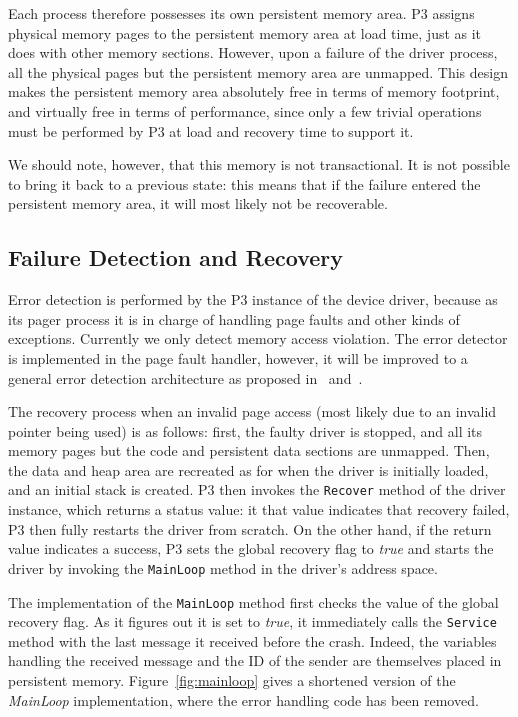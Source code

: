\documentclass{acm_proc_article-sp}
\begin{document}
Each process therefore possesses its own persistent memory area. P3 assigns physical memory pages to the persistent memory area at load time, just as it does with other memory sections. However, upon a failure of the driver process, all the physical pages but the persistent memory area are unmapped. This design makes the persistent memory area absolutely free in terms of memory footprint, and virtually free in terms of performance, since only a few trivial operations must be performed by P3 at load and recovery time to support it.

We should note, however, that this memory is not transactional. It is not possible to bring it back to a previous state: this means that if the failure entered the persistent memory area, it will most likely not be recoverable.

\subsection{Failure Detection and Recovery}
Error detection is performed by the P3 instance of the device driver, because as its pager process it is in charge of handling page faults and other kinds of exceptions. Currently we only detect memory access violation.  The error detector is implemented in the page fault handler, however, it will be improved to a general error detection architecture as proposed in~\cite{Qin2007} and~\cite{Wang2006}.

The recovery process when an invalid page access (most likely due to an invalid pointer being used) is as follows: first, the faulty driver is stopped, and all its memory pages but the code and persistent data sections are unmapped. Then, the data and heap area are recreated as for when the driver is initially loaded, and an initial stack is created. P3 then invokes the \texttt{Recover} method of the driver instance, which returns a status value: it that value indicates that recovery failed, P3 then fully restarts the driver from scratch. On the other hand, if the return value indicates a success, P3 sets the global recovery flag to \emph{true} and starts the driver by invoking the \texttt{MainLoop} method in the driver's address space.

The implementation of the \texttt{MainLoop} method first checks the value of the global recovery flag. As it figures out it is set to \emph{true}, it immediately calls the \texttt{Service} method with the last message it received before the crash. Indeed, the variables handling the received message and the ID of the sender are themselves placed in persistent memory. Figure~\ref{fig:mainloop} gives a shortened version of the \emph{MainLoop} implementation, where the error handling code has been removed.
\end{document}

